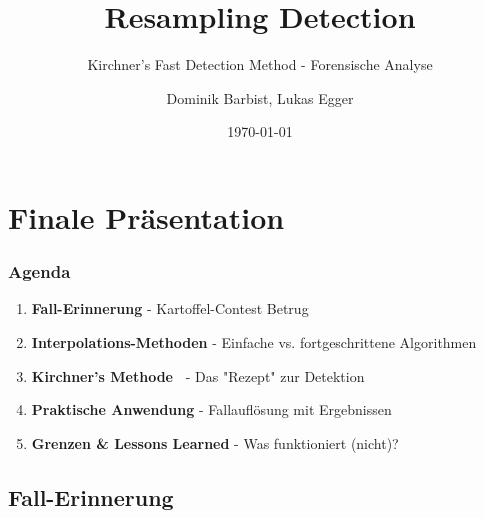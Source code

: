 \documentclass[11pt,t,usepdftitle=false,aspectratio=169]{beamer}
\title[Resampling Detection - Finale Präsentation]{Resampling Detection}
\subtitle{Kirchner's Fast Detection Method - Forensische Analyse}
\author[Dominik Barbist, Lukas Egger]{Dominik Barbist, Lukas Egger \\ \vspace{0.5em}}
\date{\today}
\begin{document}
\section{Finale Präsentation}

\begin{frame}
	\frametitle{Agenda}
	
	\vspace{1em}
	
	\begin{enumerate}
		\setlength{\itemsep}{0.5em}
		\item \textbf{Fall-Erinnerung} - Kartoffel-Contest Betrug
		\item \textbf{Interpolations-Methoden} - Einfache vs. fortgeschrittene Algorithmen
		\item \textbf{Kirchner's Methode~\cite{kirchner_fast_2008}} - Das "Rezept" zur Detektion
		\item \textbf{Praktische Anwendung} - Fallauflösung mit Ergebnissen
		\item \textbf{Grenzen \& Lessons Learned} - Was funktioniert (nicht)?
	\end{enumerate}
\end{frame}

\subsection{Fall-Erinnerung}
\end{document}
